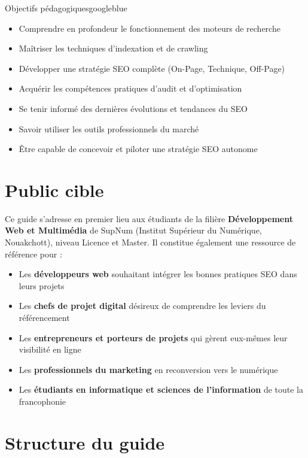 \documentclass[12pt,a4paper,twoside]{report}
\newcommand{\keyword}[1]{\textbf{\textcolor{googleblue}{#1}}}
\begin{document}
\begin{mybox}{Objectifs pédagogiques}{googleblue}
\begin{itemize}
    \item Comprendre en profondeur le fonctionnement des moteurs de recherche
    \item Maîtriser les techniques d'indexation et de crawling
    \item Développer une stratégie SEO complète (On-Page, Technique, Off-Page)
    \item Acquérir les compétences pratiques d'audit et d'optimisation
    \item Se tenir informé des dernières évolutions et tendances du SEO
    \item Savoir utiliser les outils professionnels du marché
    \item Être capable de concevoir et piloter une stratégie SEO autonome
\end{itemize}
\end{mybox}

\section*{Public cible}

Ce guide s'adresse en premier lieu aux étudiants de la filière \keyword{Développement Web et Multimédia} de SupNum (Institut Supérieur du Numérique, Nouakchott), niveau Licence et Master. Il constitue également une ressource de référence pour :

\begin{itemize}
    \item Les \keyword{développeurs web} souhaitant intégrer les bonnes pratiques SEO dans leurs projets
    \item Les \keyword{chefs de projet digital} désireux de comprendre les leviers du référencement
    \item Les \keyword{entrepreneurs et porteurs de projets} qui gèrent eux-mêmes leur visibilité en ligne
    \item Les \keyword{professionnels du marketing} en reconversion vers le numérique
    \item Les \keyword{étudiants en informatique et sciences de l'information} de toute la francophonie
\end{itemize}

\section*{Structure du guide}
\end{document}
